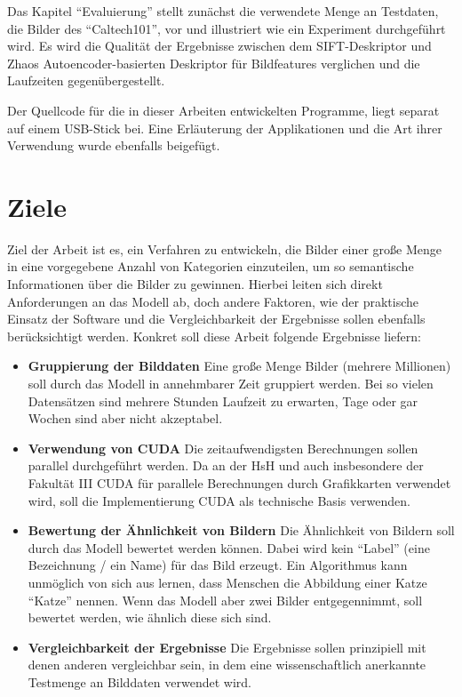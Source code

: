 Das Kapitel \enquote{Evaluierung} stellt zunächst die verwendete Menge an Testdaten, die Bilder des \enquote{Caltech101}, vor und illustriert wie ein Experiment durchgeführt wird. Es wird die Qualität der Ergebnisse zwischen dem SIFT-Deskriptor und Zhaos Autoencoder-basierten Deskriptor für Bildfeatures verglichen und die Laufzeiten gegenübergestellt.\newline

Der Quellcode für die in dieser Arbeiten entwickelten Programme, liegt separat auf einem USB-Stick bei. Eine Erläuterung der Applikationen und die Art ihrer Verwendung wurde ebenfalls beigefügt.

\section{Ziele}

Ziel der Arbeit ist es, ein Verfahren zu entwickeln, die Bilder einer große Menge in eine vorgegebene Anzahl von Kategorien einzuteilen, um so semantische Informationen über die Bilder zu gewinnen. Hierbei leiten sich direkt Anforderungen an das Modell ab, doch andere Faktoren, wie der praktische Einsatz der Software und die Vergleichbarkeit der Ergebnisse sollen ebenfalls berücksichtigt werden. Konkret soll diese Arbeit folgende Ergebnisse liefern:

\begin{itemize}
	\item \textbf{Gruppierung der Bilddaten} Eine große Menge Bilder (mehrere Millionen) soll durch das Modell in annehmbarer Zeit gruppiert werden. Bei so vielen Datensätzen sind mehrere Stunden Laufzeit zu erwarten, Tage oder gar Wochen sind aber nicht akzeptabel. 
	\item \textbf{Verwendung von CUDA} Die zeitaufwendigsten Berechnungen sollen parallel durchgeführt werden. Da an der HsH und auch insbesondere der Fakultät III CUDA für parallele Berechnungen durch Grafikkarten verwendet wird, soll die Implementierung CUDA als technische Basis verwenden.
	\item \textbf{Bewertung der Ähnlichkeit von Bildern} Die Ähnlichkeit von Bildern soll durch das Modell bewertet werden können. Dabei wird kein \enquote{Label} (eine Bezeichnung / ein Name) für das Bild erzeugt. Ein Algorithmus kann unmöglich von sich aus lernen, dass Menschen die Abbildung einer Katze \enquote{Katze} nennen. Wenn das Modell aber zwei Bilder entgegennimmt, soll bewertet werden, wie ähnlich diese sich sind.
	\item \textbf{Vergleichbarkeit der Ergebnisse} Die Ergebnisse sollen prinzipiell mit denen anderen vergleichbar sein, in dem eine wissenschaftlich anerkannte Testmenge an Bilddaten verwendet wird.
\end{itemize}
